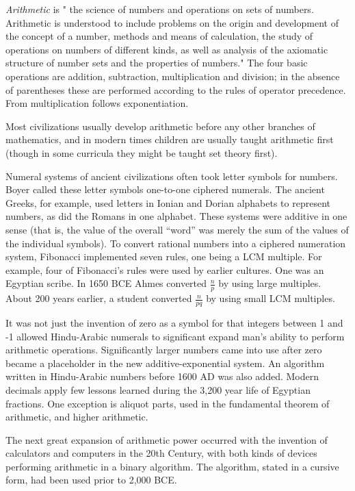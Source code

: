 \documentclass[12pt]{article}
\begin{document}
{\em Arithmetic} is " the science of numbers and operations on sets of numbers. Arithmetic is understood to include problems on the origin and development of the concept of a number, methods and means of calculation, the study of operations on numbers of different kinds, as well as analysis of the axiomatic structure of number sets and the properties of numbers." The four basic operations are addition, subtraction, multiplication and division; in the absence of parentheses these are performed according to the rules of operator precedence. From multiplication follows exponentiation.

Most civilizations usually develop arithmetic before any other branches of mathematics, and in modern times children are usually taught arithmetic first (though in some curricula they might be taught set theory first).

Numeral systems of ancient civilizations often took letter symbols for numbers. Boyer called these letter symbols one-to-one ciphered numerals. The ancient Greeks, for example, used letters in Ionian and Dorian alphabets to represent numbers, as did the Romans in one alphabet. These systems were additive in one sense (that is, the value of the overall ``word'' was merely the sum of the values of the individual symbols). To convert rational numbers into a ciphered numeration system, Fibonacci implemented seven rules, one being a LCM multiple. For example, four of Fibonacci's rules were used by earlier cultures. One was an Egyptian scribe. In 1650 BCE Ahmes converted
$\frac{n}{p}$ by using large multiples. About 200 years earlier, a student converted $\frac{n}{pq}$ by using small LCM multiples.

It was not just the invention of zero as a symbol for that integers between 1 and -1 allowed Hindu-Arabic numerals to significant expand man's ability to perform arithmetic operations. Significantly larger numbers came into use after zero became a placeholder in the new additive-exponential system. An algorithm written in Hindu-Arabic numbers before 1600 AD was also added. Modern decimals apply few lessons learned during the 3,200 year life of Egyptian fractions. One exception is aliquot parts, used in the fundamental theorem of arithmetic, and higher arithmetic.

The next great expansion of arithmetic power occurred with the invention of calculators and computers in the 20th Century, with both kinds of devices performing arithmetic in a binary algorithm. The algorithm, stated in a cursive form, had been used prior to 2,000 BCE.
\end{document}
